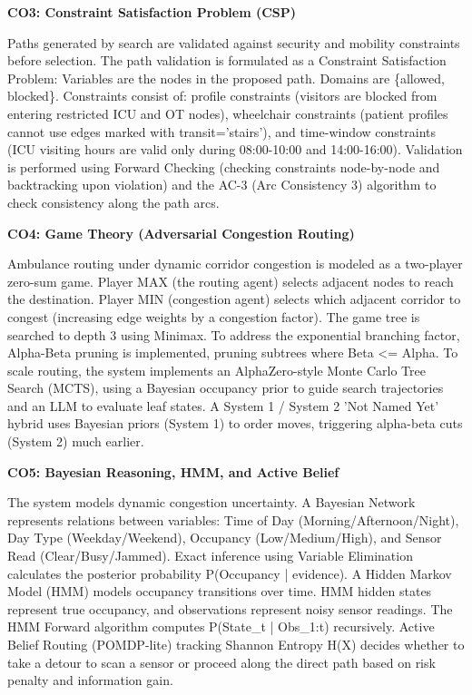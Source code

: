 \documentclass[12pt,a4paper]{report}
\begin{document}
\textbf{CO3: Constraint Satisfaction Problem (CSP)}

Paths generated by search are validated against security and mobility constraints before selection. The path validation is formulated as a Constraint Satisfaction Problem: Variables are the nodes in the proposed path. Domains are \{allowed, blocked\}. Constraints consist of: profile constraints (visitors are blocked from entering restricted ICU and OT nodes), wheelchair constraints (patient profiles cannot use edges marked with transit='stairs'), and time-window constraints (ICU visiting hours are valid only during 08:00-10:00 and 14:00-16:00). Validation is performed using Forward Checking (checking constraints node-by-node and backtracking upon violation) and the AC-3 (Arc Consistency 3) algorithm to check consistency along the path arcs.

\textbf{CO4: Game Theory (Adversarial Congestion Routing)}

Ambulance routing under dynamic corridor congestion is modeled as a two-player zero-sum game. Player MAX (the routing agent) selects adjacent nodes to reach the destination. Player MIN (congestion agent) selects which adjacent corridor to congest (increasing edge weights by a congestion factor). The game tree is searched to depth 3 using Minimax. To address the exponential branching factor, Alpha-Beta pruning is implemented, pruning subtrees where Beta <= Alpha. To scale routing, the system implements an AlphaZero-style Monte Carlo Tree Search (MCTS), using a Bayesian occupancy prior to guide search trajectories and an LLM to evaluate leaf states. A System 1 / System 2 'Not Named Yet' hybrid uses Bayesian priors (System 1) to order moves, triggering alpha-beta cuts (System 2) much earlier.

\textbf{CO5: Bayesian Reasoning, HMM, and Active Belief}

The system models dynamic congestion uncertainty. A Bayesian Network represents relations between variables: Time of Day (Morning/Afternoon/Night), Day Type (Weekday/Weekend), Occupancy (Low/Medium/High), and Sensor Read (Clear/Busy/Jammed). Exact inference using Variable Elimination calculates the posterior probability P(Occupancy | evidence). A Hidden Markov Model (HMM) models occupancy transitions over time. HMM hidden states represent true occupancy, and observations represent noisy sensor readings. The HMM Forward algorithm computes P(State\_t | Obs\_1:t) recursively. Active Belief Routing (POMDP-lite) tracking Shannon Entropy H(X) decides whether to take a detour to scan a sensor or proceed along the direct path based on risk penalty and information gain.
\end{document}

